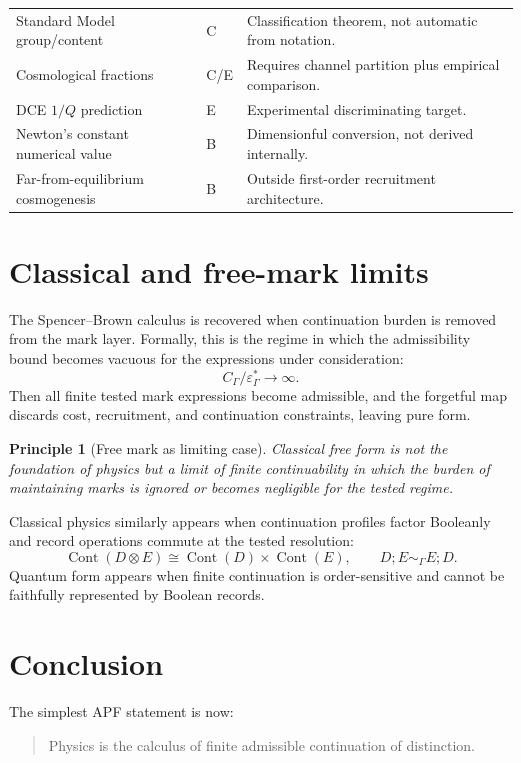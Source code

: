 \documentclass[11pt]{article}
\newtheorem{principle}[theorem]{Principle}
\theoremstyle{remark}
\newcommand{\G}{\Gamma}
\newcommand{\Cont}{\operatorname{Cont}}
\newcommand{\floor}{\varepsilon^{\!*}_{\G}}
\newcommand{\Status}[1]{\textsf{#1}}
\begin{document}
\begin{center}
\begin{longtable}{p{}p{}p{}}
Standard Model group/content & \Status{C} & Classification theorem, not automatic from notation.\\
Cosmological fractions & \Status{C/E} & Requires channel partition plus empirical comparison.\\
DCE \(1/Q\) prediction & \Status{E} & Experimental discriminating target.\\
Newton's constant numerical value & \Status{B} & Dimensionful conversion, not derived internally.\\
Far-from-equilibrium cosmogenesis & \Status{B} & Outside first-order recruitment architecture.\\
\bottomrule
\end{longtable}
\end{center}

\section{Classical and free-mark limits}

The Spencer--Brown calculus is recovered when continuation burden is removed from the mark layer.  Formally, this is the regime in which the admissibility bound becomes vacuous for the expressions under consideration:
\[
        C_\G/\floor\to\infty.
\]
Then all finite tested mark expressions become admissible, and the forgetful map discards cost, recruitment, and continuation constraints, leaving pure form.

\begin{principle}[Free mark as limiting case]
Classical free form is not the foundation of physics but a limit of finite continuability in which the burden of maintaining marks is ignored or becomes negligible for the tested regime.
\end{principle}

Classical physics similarly appears when continuation profiles factor Booleanly and record operations commute at the tested resolution:
\[
        \Cont(D\otimes E)\cong \Cont(D)\times\Cont(E),
        \qquad
        D;E\sim_\G E;D.
\]
Quantum form appears when finite continuation is order-sensitive and cannot be faithfully represented by Boolean records.

\section{Conclusion}

The simplest APF statement is now:

\begin{quote}
Physics is the calculus of finite admissible continuation of distinction.
\end{quote}
\end{document}
